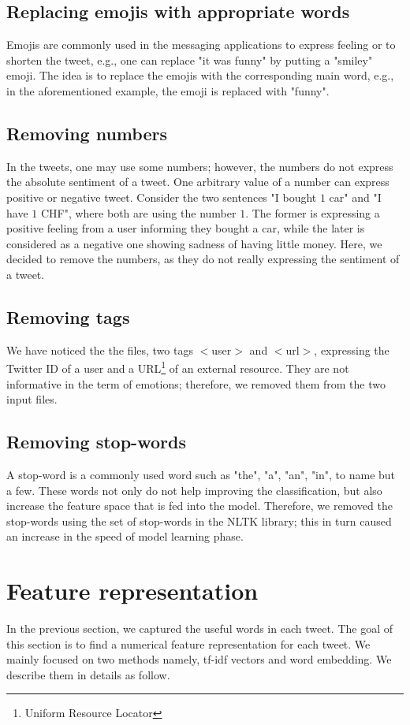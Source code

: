 \documentclass[8pt,conference,compsocconf]{IEEEtran}
\begin{document}
\subsection{Replacing emojis with appropriate words}
Emojis are commonly used in the messaging applications to express feeling or to shorten the tweet, e.g., one can replace "it was funny" by putting a "smiley" emoji. The idea is to replace the emojis with the corresponding main word, e.g., in the aforementioned example, the emoji is replaced with "funny".
\subsection{Removing numbers}
In the tweets, one may use some numbers; however, the numbers do not express the absolute sentiment of a tweet. One arbitrary value of a number can express positive or negative tweet. Consider the two sentences "I bought $1$ car" and "I have $1$ CHF", where both are using the number $1$. The former is expressing a positive feeling from a user informing they bought a car, while the later is considered as a negative one showing sadness of having little money. Here, we decided to remove the numbers, as they do not really expressing the sentiment of a tweet.
\subsection{Removing tags}
We have noticed the the files, two tags $<$user$>$ and $<$url$>$, expressing the Twitter ID of a user and a URL\footnote{Uniform Resource Locator} of an external resource. They are not informative in the term of emotions; therefore, we removed them from the two input files.
\subsection{Removing stop-words}
A stop-word is a commonly used word such as "the", "a", "an", "in", to name but a few. These words not only do not help improving the classification, but also increase the feature space that is fed into the model. Therefore, we removed the stop-words using the set of stop-words in the NLTK library; this in turn caused an increase in the speed of model learning phase.

\section{Feature representation}\label{sec:embedding}
In the previous section, we captured the useful words in each tweet. The goal of this section is to find a numerical feature representation for each tweet. We mainly focused on two methods namely, tf-idf vectors and word embedding. We describe them in details as follow. 
\end{document}
